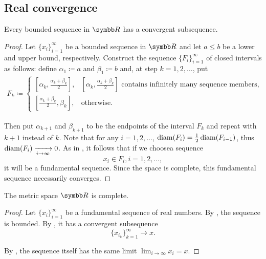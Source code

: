 \subsection{Real convergence}\label{subsec:real_vector_space_convergence}

\begin{theorem}\label{def:bolzano_weierstrass}
  Every bounded sequence in \( \BR \) has a convergent subsequence.
\end{theorem}
\begin{proof}
  Let \( \{ x_i \}_{i=1}^\infty \) be a bounded sequence in \( \BR \) and let \( a \leq b \) be a lower and upper bound, respectively. Construct the sequence \( \{ F_i \}_{i=1}^\infty \) of closed intervals as follows: define \( \alpha_1 \coloneqq a \) and \( \beta_1 \coloneqq b \) and, at step \( k = 1, 2, \ldots \), put
  \begin{align*}
    F_k \coloneqq \begin{cases}
      [\alpha_k, \tfrac{\alpha_k+\beta_k} 2], &[\alpha_k, \tfrac{\alpha_k+\beta_k} 2]\text{ contains infinitely many sequence members}, \\
      [\tfrac{\alpha_k+\beta_k} 2, \beta_k], &\text{otherwise}.
    \end{cases}
  \end{align*}

  Then put \( \alpha_{k+1} \) and \( \beta_{k+1} \) to be the endpoints of the interval \( F_k \) and repeat with \( k+1 \) instead of \( k \). Note that for any \( i = 1, 2, \ldots \), \( \operatorname{diam}(F_i) = \tfrac 1 2 \operatorname{diam}(F_{i-1}) \), thus \( \operatorname{diam}(F_i) \xrightarrow[i \to \infty]{} 0 \). As in , it follows that if we choose\AOC a sequence
  \begin{equation*}
    x_i \in F_i, i = 1, 2, \ldots,
  \end{equation*}
  it will be a fundamental sequence. Since the space is complete, this fundamental sequence necessarily converges.
\end{proof}

\begin{theorem}\label{def:real_numbers_complete_metric_space}
  The metric space \( \BR \) is complete.
\end{theorem}
\begin{proof}
  Let \( \{ x_i \}_{i=1}^\infty \) be a fundamental sequence of real numbers. By , the sequence is bounded. By , it has a convergent subsequence
  \begin{equation*}
    \{ x_{i_k} \}_{k=1}^\infty \to x.
  \end{equation*}

  By , the sequence itself has the same limit \( \lim_{i \to \infty} x_i = x \).
\end{proof}

